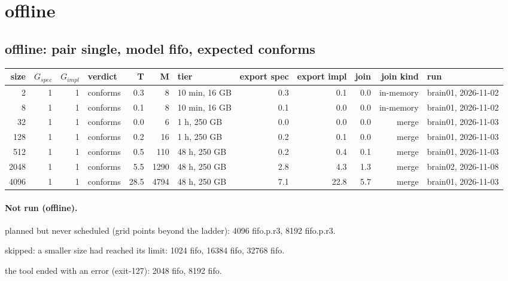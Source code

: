 \documentclass[10pt]{article}
\begin{document}
\section*{offline}
\subsection*{offline: pair \textsf{single}, model fifo, expected conforms}
\begin{longtable}{@{}rrrlrrlrrrrl@{}}
\toprule
size & $G_{\mathit{spec}}$ & $G_{\mathit{impl}}$ & verdict & T & M & tier & export spec & export impl & join & join kind & run \\
\midrule
\endhead
\color{red} 2 & 1 & 1 & conforms & 0.3 & 8 & 10 min, 16 GB & 0.3 & 0.1 & 0.0 & in-memory & brain01, 2026-11-02 \\
\color{red} 8 & 1 & 1 & conforms & 0.1 & 8 & 10 min, 16 GB & 0.1 & 0.0 & 0.0 & in-memory & brain01, 2026-11-02 \\
\color{blue} 32 & 1 & 1 & conforms & 0.0 & 6 & 1 h, 250 GB & 0.0 & 0.0 & 0.0 & merge & brain01, 2026-11-03 \\
\color{blue} 128 & 1 & 1 & conforms & 0.2 & 16 & 1 h, 250 GB & 0.2 & 0.1 & 0.0 & merge & brain01, 2026-11-03 \\
\color{blue} 512 & 1 & 1 & conforms & 0.5 & 110 & 48 h, 250 GB & 0.2 & 0.4 & 0.1 & merge & brain01, 2026-11-03 \\
\color{blue} 2048 & 1 & 1 & conforms & 5.5 & 1290 & 48 h, 250 GB & 2.8 & 4.3 & 1.3 & merge & brain02, 2026-11-08 \\
\color{blue} 4096 & 1 & 1 & conforms & 28.5 & 4794 & 48 h, 250 GB & 7.1 & 22.8 & 5.7 & merge & brain01, 2026-11-03 \\
\bottomrule
\end{longtable}
\paragraph{Not run (offline).}
planned but never scheduled (grid points beyond the ladder): 4096 fifo.p.r3, 8192 fifo.p.r3.\par
skipped: a smaller size had reached its limit: 1024 fifo, 16384 fifo, 32768 fifo.\par
the tool ended with an error (exit-127): 2048 fifo, 8192 fifo.\par
\end{document}

